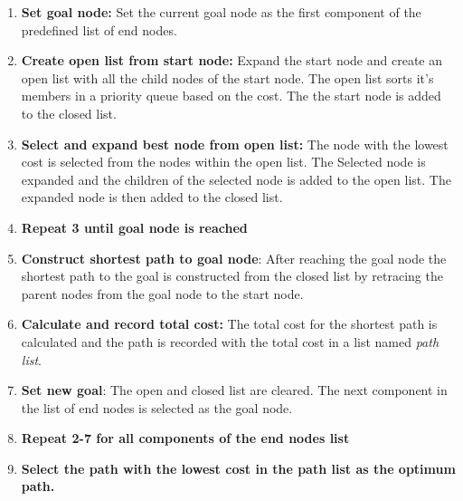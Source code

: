 \begin{enumerate}
\item \textbf{Set goal node:} Set the current goal node as the first component of the predefined list of end nodes. 
\item \textbf{Create open list from start node:} Expand the start node and create an open list with all the child nodes of the start node. The open list sorts it's members in a priority queue based on the cost. The the start node is added to the closed list.
\item \textbf{Select and expand best node from open list:} The node with the lowest cost is selected from the nodes within the open list. The Selected node is expanded and the children of the selected node is added to the open list. The expanded node is then added to the closed list.
\item \textbf{Repeat 3 until goal node is reached}
\item \textbf{Construct shortest path to goal node}: After reaching the goal node the shortest path to the goal is constructed from the closed list by retracing the parent nodes from the goal node to the start node.
\item \textbf{Calculate and record total cost:} The total cost for the shortest path is calculated and the path is recorded with the total cost in a list named \textit{path list}.
\item \textbf{Set new goal}: The open and closed list are cleared. The next component in the list of end nodes is selected as the goal node.
\item \textbf{Repeat 2-7 for all components of the end nodes list}
\item \textbf{Select the path with the lowest cost in the path list as the optimum path.}
\end{enumerate}